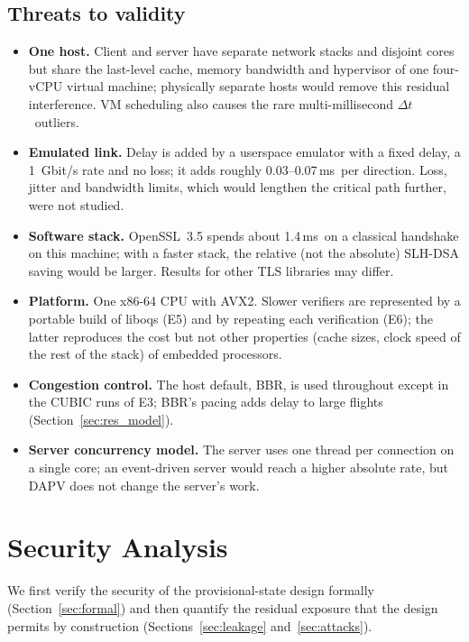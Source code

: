 \documentclass[preprint,10pt,3p]{elsarticle}
\newcommand{\Dt}{\ensuremath{\Delta t}}
\newcommand{\ms}{\,ms}
\begin{document}
\subsection{Threats to validity}
\label{sec:threats}

\begin{itemize}[leftmargin=*]
\item \textbf{One host.}  Client and server have separate network stacks
  and disjoint cores but share the last-level cache, memory bandwidth and
  hypervisor of one four-vCPU virtual machine; physically separate hosts
  would remove this residual interference.  VM scheduling also causes the
  rare multi-millisecond \Dt\ outliers.
\item \textbf{Emulated link.}  Delay is added by a userspace emulator with
  a fixed delay, a 1~Gbit/s rate and no loss; it adds roughly
  0.03--0.07\ms\ per direction.  Loss, jitter and bandwidth limits, which
  would lengthen the critical path further, were not studied.
\item \textbf{Software stack.}  OpenSSL~3.5 spends about 1.4\ms\ on a
  classical handshake on this machine; with a faster stack, the relative
  (not the absolute) SLH-DSA saving would be larger.  Results for other
  TLS libraries may differ.
\item \textbf{Platform.}  One x86-64 CPU with AVX2.  Slower verifiers are
  represented by a portable build of liboqs (E5) and by repeating each
  verification (E6); the latter reproduces the cost but not other
  properties (cache sizes, clock speed of the rest of the stack) of
  embedded processors.
\item \textbf{Congestion control.}  The host default, BBR, is used
  throughout except in the CUBIC runs of E3; BBR's pacing adds delay to
  large flights (Section~\ref{sec:res_model}).
\item \textbf{Server concurrency model.}  The server uses one thread per
  connection on a single core; an event-driven server would reach a higher
  absolute rate, but DAPV does not change the server's work.
\end{itemize}

\section{Security Analysis}
\label{sec:security}

We first verify the security of the provisional-state design formally
(Section~\ref{sec:formal}) and then quantify the residual exposure that
the design permits by construction (Sections~\ref{sec:leakage}
and~\ref{sec:attacks}).
\end{document}
